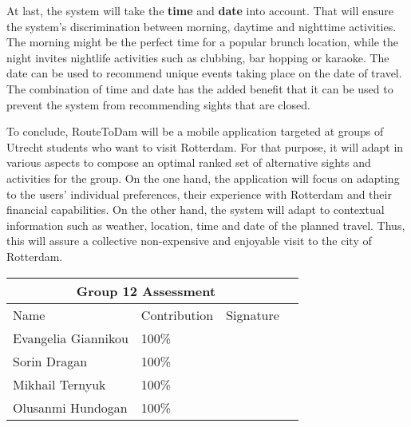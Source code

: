 \documentclass[11pt,a4paper,oneside]{article}
\begin{document}
At last, the system will take the \textbf{time} and \textbf{date} into account. That will ensure the system's discrimination between morning, daytime and nighttime activities. The morning might be the perfect time for a popular brunch location, while the night invites nightlife activities such as clubbing, bar hopping or karaoke. The date can be used to recommend unique events taking place on the date of travel. The combination of time and date has the added benefit that it can be used to prevent the system from recommending sights that are closed.  

To conclude, RouteToDam will be a mobile application targeted at groups of Utrecht students who want to visit Rotterdam. For that purpose, it will adapt in various aspects to compose an optimal ranked set of alternative sights and activities for the group. On the one hand, the application will focus on adapting to the users' individual preferences, their experience with Rotterdam and their financial capabilities. On the other hand, the system will adapt to contextual information such as weather, location, time and date of the planned travel. Thus, this will assure a collective non-expensive and enjoyable visit to the city of Rotterdam.

\clearpage 
\printbibliography

\clearpage
\Large
\begin{tabularx}{\textwidth}{|X|X|X|X|}
\hline
\multicolumn{3}{|c|}{Group 12 Assessment}    \\ \hline
Name                & Contribution & Signature \\ \hline
\hline
Evangelia Giannikou & 100\%        &           \\ \hline
Sorin Dragan        & 100\%        &           \\ \hline
Mikhail Ternyuk     & 100\%        &           \\ \hline
Olusanmi Hundogan   & 100\%        &           \\ \hline
\end{tabularx}
\end{document}
